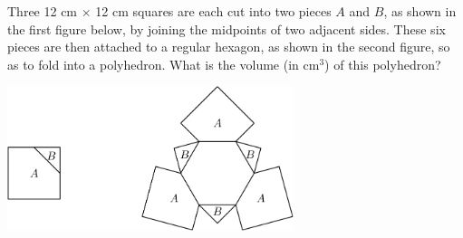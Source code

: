 Three 12 cm $\times$ 12 cm squares are each cut into two pieces $A$ and $B$, as shown in the first figure below, by joining the midpoints of two adjacent sides.  These six pieces are then attached to a regular hexagon, as shown in the second figure, so as to fold into a polyhedron.  What is the volume (in $\text{cm}^3$) of this polyhedron?

\begin{center}
\includegraphics[width = 83.60000000000001mm]{img/fig0.png}
\end{center}